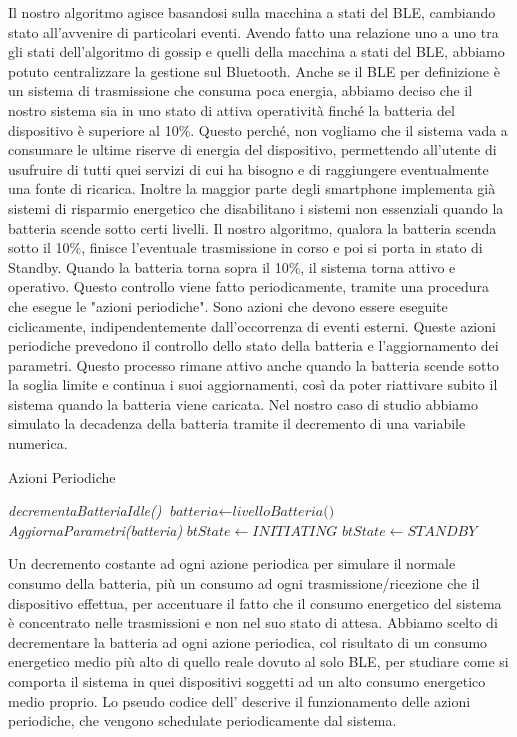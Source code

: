 Il nostro algoritmo agisce basandosi sulla macchina a stati del \acs{BLE}, cambiando stato all'avvenire di particolari eventi. Avendo fatto una relazione uno a uno tra gli stati dell'algoritmo di gossip e quelli della macchina a stati del \acs{BLE}, abbiamo potuto centralizzare la gestione sul Bluetooth. Anche se il \acs{BLE} per definizione è un sistema di trasmissione che consuma poca energia, abbiamo deciso che il nostro sistema sia in uno stato di attiva operatività finché la batteria del dispositivo è superiore al 10\%. Questo perché, non vogliamo che il sistema vada a consumare le ultime riserve di energia del dispositivo, permettendo all'utente di usufruire di tutti quei servizi di cui ha bisogno e di raggiungere eventualmente una fonte di ricarica. Inoltre la maggior parte degli smartphone implementa già sistemi di risparmio energetico che disabilitano i sistemi non essenziali quando la batteria scende sotto certi livelli.
Il nostro algoritmo, qualora la batteria scenda sotto il 10\%, finisce l'eventuale trasmissione in corso e poi si porta in stato di Standby. Quando la batteria torna sopra il 10\%, il sistema torna attivo e operativo. Questo controllo viene fatto periodicamente, tramite una procedura che esegue le "azioni periodiche". Sono azioni che devono essere eseguite ciclicamente, indipendentemente dall'occorrenza di eventi esterni. Queste azioni periodiche prevedono il controllo dello stato della batteria e l'aggiornamento dei parametri. Questo processo rimane attivo anche quando la batteria scende sotto la soglia limite e continua i suoi aggiornamenti, così da poter riattivare subito il sistema quando la batteria viene caricata. Nel nostro caso di studio abbiamo simulato la decadenza della batteria tramite il decremento di una variabile numerica.
\begin{algorithm}[t]
	\caption{Azioni Periodiche}\label{alg:periodic_actions}
	\begin{algorithmic}[1]
		\State \textit{decrementaBatteriaIdle()}
		\State $ \textit{batteria} \gets \textit{livelloBatteria() } $
		\State \textit{AggiornaParametri(\textit{batteria})}
		\State $ \textit{btState} \gets INITIATING $
		\EndIf
		\Else
		\State $ \textit{btState} \gets STANDBY $
		\EndIf
		\EndFunction
	\end{algorithmic}
\end{algorithm}
Un decremento costante ad ogni azione periodica per simulare il normale consumo della batteria, più un consumo ad ogni trasmissione/ricezione che il dispositivo effettua, per accentuare il fatto che il consumo energetico del sistema è concentrato nelle trasmissioni e non nel suo stato di attesa. Abbiamo scelto di decrementare la batteria ad ogni azione periodica, col risultato di un consumo energetico medio più alto di quello reale dovuto al solo \acs{BLE}, per studiare come si comporta il sistema in quei dispositivi soggetti ad un alto consumo energetico medio proprio. Lo pseudo codice dell' descrive il funzionamento delle azioni periodiche, che vengono schedulate periodicamente dal sistema.
